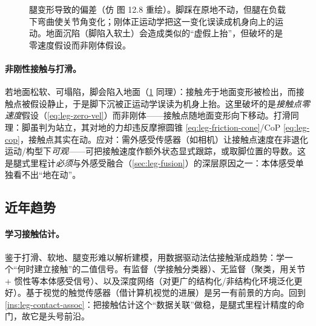 \begin{figure}[ht]
\centering
{}
\caption{腿变形导致的偏差（仿 \cite{carlone2026handbook} 图 12.8 重绘）。脚踩在原地不动，但腿在负载下弯曲使关节角变化；刚体正运动学把这一变化误读成机身向上的运动。地面沉陷（脚陷入软土）会造成类似的“虚假上抬”，但破坏的是零速度假设而非刚体假设。}
\label{fig:leg-deform}
\end{figure}

\paragraph{非刚性接触与打滑。}
若地面松软、可塌陷，脚会陷入地面（\cref{fig:leg-deform} 同理）：接触\emph{先}于地面变形被检出，而接触点被假设静止，于是脚下沉被正运动学误读为机身上抬。这里破坏的是\emph{接触点零速度}假设（\cref{eq:leg-zero-vel}）而非刚体——接触点随地面变形向下移动。打滑同理：脚虽判为站立，其对地的力却违反摩擦圆锥 \cref{eq:leg-friction-cone}/CoP \cref{eq:leg-cop}，接触点其实在动。应对：需外感受传感器（如相机）让接触点速度在非退化运动/构型下\emph{可观}\cite{wisth2023vilens}——可把接触速度作额外状态显式跟踪，或取脚位置的导数。这是腿式里程计\emph{必须}与外感受融合（\cref{sec:leg-fusion}）的深层原因之一：本体感受单独看不出“地在动”。

\subsection{近年趋势}
\label{subsec:leg-trends}

\paragraph{学习接触估计。}
鉴于打滑、软地、腿变形难以解析建模，用数据驱动法估接触渐成趋势：学一个“何时建立接触”的二值信号。有监督（学接触分类器\cite{bloesch2013state}）、无监督（聚类，用关节 + 惯性等本体感受信号\cite{carlone2026handbook}）、以及深度网络（对更广的结构化/非结构化环境泛化更好\cite{hartley2020contact}）。基于视觉的触觉传感器（借计算机视觉的进展）是另一有前景的方向。回到 \cref{ins:leg-contact-assoc}：把接触估计这个“数据关联”做稳，是腿式里程计精度的命门，故它是头号前沿。

